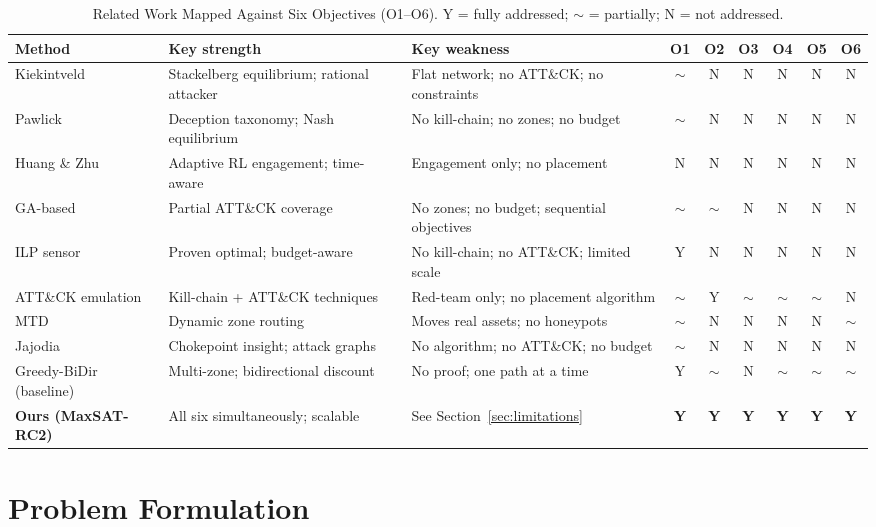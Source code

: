 \documentclass[journal]{IEEEtran}
\begin{document}
\begin{table}[t]
\caption{Related Work Mapped Against Six Objectives (O1--O6).
  Y = fully addressed; $\sim$ = partially; N = not addressed.}
\label{tab:related_obj}
\centering
\renewcommand{\arraystretch}{1.2}
\begin{tabular}{lp{3.0cm}p{3.4cm}cccccc}
\toprule
Method & Key strength & Key weakness & O1 & O2 & O3 & O4 & O5 & O6 \\
\midrule
Kiekintveld~\cite{kiekintveld2015} &
  Stackelberg equilibrium; rational attacker &
  Flat network; no ATT\&CK; no constraints &
  $\sim$ & N & N & N & N & N \\
Pawlick~\cite{pawlick2019} &
  Deception taxonomy; Nash equilibrium &
  No kill-chain; no zones; no budget &
  $\sim$ & N & N & N & N & N \\
Huang \& Zhu~\cite{huang2019} &
  Adaptive RL engagement; time-aware &
  Engagement only; no placement &
  N & N & N & N & N & N \\
GA-based~\cite{hemberg2018} &
  Partial ATT\&CK coverage &
  No zones; no budget; sequential objectives &
  $\sim$ & $\sim$ & N & N & N & N \\
ILP sensor~\cite{saha2015} &
  Proven optimal; budget-aware &
  No kill-chain; no ATT\&CK; limited scale &
  Y & N & N & N & N & N \\
ATT\&CK emulation~\cite{applebaum2016} &
  Kill-chain + ATT\&CK techniques &
  Red-team only; no placement algorithm &
  $\sim$ & Y & $\sim$ & $\sim$ & $\sim$ & N \\
MTD~\cite{zhu2013} &
  Dynamic zone routing &
  Moves real assets; no honeypots &
  $\sim$ & N & N & N & N & $\sim$ \\
Jajodia~\cite{jajodia2005} &
  Chokepoint insight; attack graphs &
  No algorithm; no ATT\&CK; no budget &
  $\sim$ & N & N & N & N & N \\
Greedy-BiDir (baseline) &
  Multi-zone; bidirectional discount &
  No proof; one path at a time &
  Y & $\sim$ & N & $\sim$ & $\sim$ & $\sim$ \\
\midrule
\textbf{Ours (MaxSAT-RC2)} &
  All six simultaneously; scalable &
  See Section~\ref{sec:limitations} &
  \textbf{Y} & \textbf{Y} & \textbf{Y} & \textbf{Y} & \textbf{Y} & \textbf{Y} \\
\bottomrule
\end{tabular}
\end{table}

\section{Problem Formulation}
\label{sec:problem}
\end{document}
